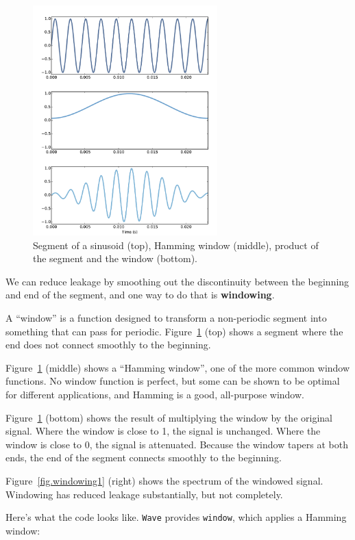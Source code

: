 \documentclass[12pt]{book}
\begin{document}
\begin{figure}
\centerline{\includegraphics[height=3.5in]{figs/windowing2.pdf}}
\caption{Segment of a sinusoid (top), Hamming window (middle), product
of the segment and the window (bottom).}
\label{fig.windowing2}
\end{figure}

We can reduce leakage by smoothing out the discontinuity between
the beginning and end of the segment, and one way to do that is
{\bf windowing}.

A ``window'' is a function designed to transform a non-periodic
segment into something that can pass for periodic.
Figure~\ref{fig.windowing2} (top) shows a segment where the end does not
connect smoothly to the beginning.

Figure~\ref{fig.windowing2} (middle) shows a ``Hamming window'', one of the
more common window functions.  No window function is perfect, but some
can be shown to be optimal for different applications, and Hamming
is a good, all-purpose window.

Figure~\ref{fig.windowing2} (bottom) shows the result of multiplying the
window by the original signal.  Where the window is close to 1, the
signal is unchanged.  Where the window is close to 0, the signal is
attenuated.  Because the window tapers at both ends, the end of the
segment connects smoothly to the beginning.

Figure~\ref{fig.windowing1} (right) shows the spectrum of the windowed
signal.  Windowing has reduced leakage substantially, but not
completely.

Here's what the code looks like.  {\tt Wave} provides {\tt window},
which applies a Hamming window:
\end{document}

